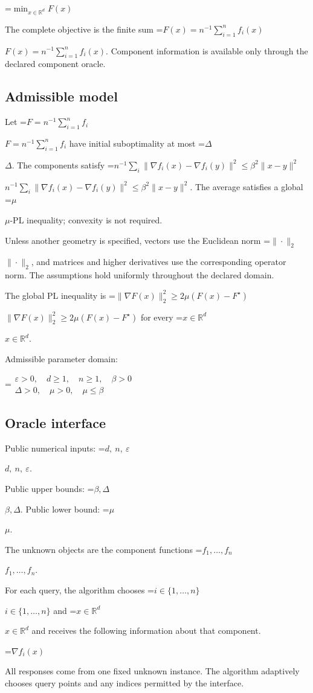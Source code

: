 \documentclass[10pt,a4paper]{article}
\newcommand{\AtlasMath}[1]{\par\begingroup\centering\setbox0=\hbox{$\displaystyle #1$}\ifdim\wd0>1.4\linewidth\typeout{ATLAS WIDE FORMULA: \the\wd0}\fi\ifdim\wd0>\linewidth\resizebox{\linewidth}{!}{\box0}\else\box0\fi\par\endgroup}
\newcommand{\AtlasInlineMath}[1]{\begingroup\setbox0=\hbox{$#1$}\ifdim\wd0>.4\linewidth\endgroup\AtlasMath{#1}\else\endgroup$#1$\fi}
\begin{document}
\AtlasMath{\min_{x\in \mathbb{R}^d}F(x)}


The complete objective is the finite sum \AtlasInlineMath{F(x)=n^{-1}\sum_{i=1}^n f_i(x)}. Component information is available only through the declared component oracle.

\subsection{Admissible model}
Let \AtlasInlineMath{F=n^{-1}\sum_{i=1}^n f_i} have initial suboptimality at most \AtlasInlineMath{\Delta}. The components satisfy \AtlasInlineMath{n^{-1}\sum_i\|\nabla f_i(x)-\nabla f_i(y)\|^2\le\beta^2\|x-y\|^2}. The average satisfies a global \AtlasInlineMath{\mu}-PL inequality; convexity is not required.

Unless another geometry is specified, vectors use the Euclidean norm \AtlasInlineMath{\|\cdot\|_2}, and matrices and higher derivatives use the corresponding operator norm. The assumptions hold uniformly throughout the declared domain.

The global PL inequality is \AtlasInlineMath{\|\nabla F(x)\|_2^2\ge2\mu(F(x)-F^\star)} for every \AtlasInlineMath{x\in\mathbb R^d}.

Admissible parameter domain:


\AtlasMath{\begin{gathered}\varepsilon > 0,\quad d \ge 1,\quad n \ge 1,\quad \beta > 0\\\Delta > 0,\quad \mu > 0,\quad \mu \le \beta\end{gathered}}


\subsection{Oracle interface}
Public numerical inputs: \AtlasInlineMath{d,\ n,\ \varepsilon}.

Public upper bounds: \AtlasInlineMath{\beta,\Delta}. Public lower bound: \AtlasInlineMath{\mu}.

The unknown objects are the component functions \AtlasInlineMath{f_1,\ldots,f_n}.

For each query, the algorithm chooses \AtlasInlineMath{i\in\{1,\ldots,n\}} and \AtlasInlineMath{x\in\mathbb R^d} and receives the following information about that component.


\AtlasMath{\nabla f_i(x)}


All responses come from one fixed unknown instance. The algorithm adaptively chooses query points and any indices permitted by the interface.
\end{document}

